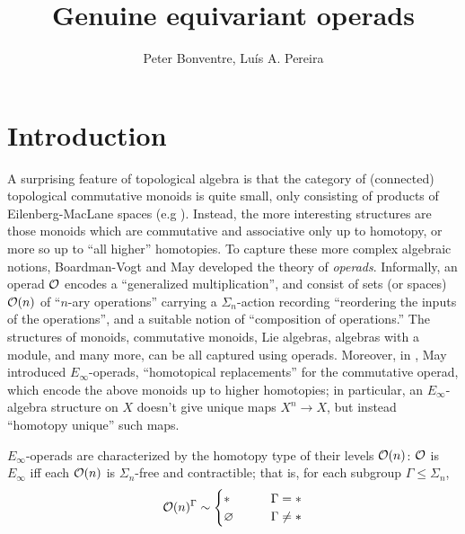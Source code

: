 \documentclass[a4paper,10pt]{article}%
\author{Peter Bonventre, Lu\'is A. Pereira}%
\title{Genuine equivariant operads}%
\begin{document}
	\maketitle%



\tableofcontents

\section{Introduction}

A surprising feature of topological algebra is that the category of (connected) topological commutative monoids is quite small, only consisting of products of Eilenberg-MacLane spaces (e.g \cite[4K.6]{Hatcher}). Instead, the more interesting structures are those monoids which are commutative and associative only up to homotopy, or more so up to ``all higher'' homotopies. To capture these more complex algebraic notions, Boardman-Vogt \cite{BV73} and May \cite{May72} developed the theory of \textit{operads}. Informally, an operad $\mathcal{O}$ encodes a ``generalized multiplication'', and consist of sets (or spaces) $\mathcal{O}(n)$ of ``$n$-ary operations'' carrying a $\Sigma_n$-action recording ``reordering the inputs of the operations'', and a suitable notion of ``composition of operations.'' The structures of monoids, commutative monoids, Lie algebras, algebras with a module, and many more, can be all captured using operads. Moreover, in \cite{May72}, May introduced $E_\infty$-operads, ``homotopical replacements'' for the commutative operad, which encode the above monoids up to higher homotopies; in particular, an $E_\infty$-algebra structure on $X$ doesn't give unique maps $X^n \to X$, but instead ``homotopy unique'' such maps. 

$E_\infty$-operads are characterized by the homotopy type of their levels $\mathcal{O}(n)$: $\mathcal{O}$ is $E_\infty$ iff each $\mathcal{O}(n)$ is $\Sigma_n$-free and contractible; that is, for each subgroup $\Gamma \leq \Sigma_n$,
\[
\mathcal{O}(n)^\Gamma \sim
\begin{cases}
        * & \Gamma = *  \\
        \varnothing \qquad & \Gamma \neq *
\end{cases}
\]
\end{document}
